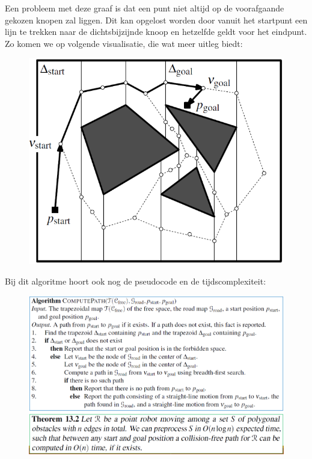 \documentclass[12pt,a4paper]{article}
\begin{document}
	Een probleem met deze graaf is dat een punt niet altijd op de voorafgaande gekozen knopen zal liggen. Dit kan opgelost worden door vanuit het startpunt een lijn te trekken naar de dichtsbijzijnde knoop en hetzelfde geldt voor het eindpunt. Zo komen we op volgende visualisatie, die wat meer uitleg biedt: 
	\begin{figure}[H]
		\centering
		\includegraphics[width=0.6\linewidth]{afbeeldingen/Motion-plannine/puntrobot}
		\label{fig:puntrobot}
	\end{figure}
	Bij dit algoritme hoort ook nog de pseudocode en de tijdscomplexiteit:
	\begin{figure}[H]
		\centering
		\includegraphics[width=0.8\linewidth]{afbeeldingen/Motion-plannine/computePath}
		\label{fig:computepath}
	\end{figure}
	 	
	
\end{document}
